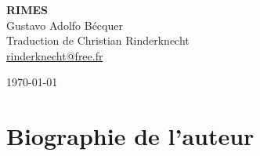 \documentclass[a4paper,12pt]{book}
\begin{document}
\thispagestyle{empty}
\vspace*{70mm}
\begin{center}
{\Huge\textbf{RIMES}} \\
\vspace*{10mm}
{\Large Gustavo Adolfo Bécquer} \\
\vspace*{10mm}
Traduction de Christian Rinderknecht\\
\url{rinderknecht@free.fr}
\end{center}

\centerline\today

\cleardoublepage

\frenchspacing  %

\chapter{Biographie de l'auteur}
\end{document}
